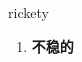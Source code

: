
\begin{frame}
{\huge rickety}
\begin{center}
\begin{enumerate}\Large
  \item \textbf{不稳的}
\end{enumerate}
\end{center}
\end{frame}
